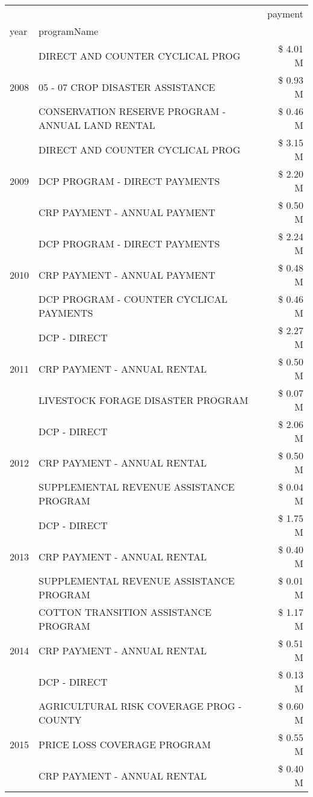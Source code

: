 \begin{tabular}{llr}
\toprule
 &  & payment \\
year & programName &  \\
\midrule
\multirow[t]{3}{*}{2008} & DIRECT AND COUNTER CYCLICAL PROG & \$ 4.01 M \\
 & 05 - 07 CROP DISASTER ASSISTANCE & \$ 0.93 M \\
 & CONSERVATION RESERVE PROGRAM - ANNUAL LAND RENTAL & \$ 0.46 M \\
\cline{1-3}
\multirow[t]{3}{*}{2009} & DIRECT AND COUNTER CYCLICAL PROG & \$ 3.15 M \\
 & DCP PROGRAM - DIRECT PAYMENTS & \$ 2.20 M \\
 & CRP PAYMENT - ANNUAL PAYMENT & \$ 0.50 M \\
\cline{1-3}
\multirow[t]{3}{*}{2010} & DCP PROGRAM - DIRECT PAYMENTS & \$ 2.24 M \\
 & CRP PAYMENT - ANNUAL PAYMENT & \$ 0.48 M \\
 & DCP PROGRAM - COUNTER CYCLICAL PAYMENTS & \$ 0.46 M \\
\cline{1-3}
\multirow[t]{3}{*}{2011} & DCP - DIRECT & \$ 2.27 M \\
 & CRP PAYMENT - ANNUAL RENTAL & \$ 0.50 M \\
 & LIVESTOCK FORAGE DISASTER PROGRAM & \$ 0.07 M \\
\cline{1-3}
\multirow[t]{3}{*}{2012} & DCP - DIRECT & \$ 2.06 M \\
 & CRP PAYMENT - ANNUAL RENTAL & \$ 0.50 M \\
 & SUPPLEMENTAL REVENUE ASSISTANCE PROGRAM & \$ 0.04 M \\
\cline{1-3}
\multirow[t]{3}{*}{2013} & DCP - DIRECT & \$ 1.75 M \\
 & CRP PAYMENT - ANNUAL RENTAL & \$ 0.40 M \\
 & SUPPLEMENTAL REVENUE ASSISTANCE PROGRAM & \$ 0.01 M \\
\cline{1-3}
\multirow[t]{3}{*}{2014} & COTTON TRANSITION ASSISTANCE PROGRAM & \$ 1.17 M \\
 & CRP PAYMENT - ANNUAL RENTAL & \$ 0.51 M \\
 & DCP - DIRECT & \$ 0.13 M \\
\cline{1-3}
\multirow[t]{3}{*}{2015} & AGRICULTURAL RISK COVERAGE PROG - COUNTY & \$ 0.60 M \\
 & PRICE LOSS COVERAGE PROGRAM & \$ 0.55 M \\
 & CRP PAYMENT - ANNUAL RENTAL & \$ 0.40 M \\
\cline{1-3}

\end{tabular}
